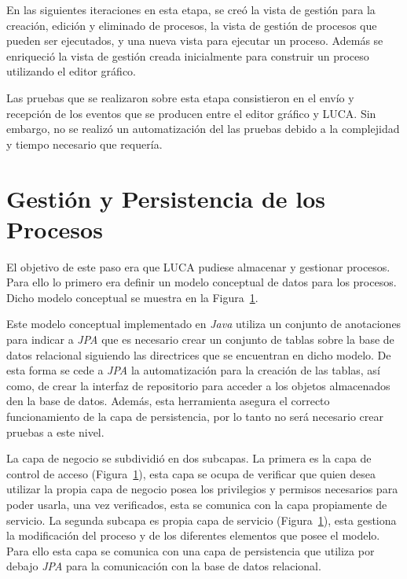 En las siguientes iteraciones en esta etapa, se creó la vista de gestión para la creación, edición y eliminado de procesos, la vista de gestión de procesos que pueden ser ejecutados, y una nueva vista para ejecutar un proceso. Además se enriqueció la vista de gestión creada inicialmente para construir un proceso utilizando el editor gráfico.

Las pruebas que se realizaron sobre esta etapa consistieron en el envío y recepción de los eventos que se producen entre el editor gráfico y LUCA. Sin embargo, no se realizó un automatización del las pruebas debido a la complejidad y tiempo necesario que requería.

\section{Gestión y Persistencia de los Procesos}

El objetivo de este paso era que LUCA pudiese almacenar y gestionar procesos. Para ello lo primero era definir un modelo conceptual de datos para los procesos. Dicho modelo conceptual se muestra en la Figura~\ref{}.

Este modelo conceptual implementado en \emph{Java} utiliza un conjunto de anotaciones para indicar a \emph{JPA}\cite{jpa} que es necesario crear un conjunto de tablas sobre la base de datos relacional siguiendo las directrices que se encuentran en dicho modelo. De esta forma se cede a \emph{JPA} la automatización para la creación de las tablas, así como, de crear la interfaz de repositorio para acceder a los objetos almacenados den la base de datos. Además, esta herramienta asegura el correcto funcionamiento de la capa de persistencia, por lo tanto no será necesario crear pruebas a este nivel.

La capa de negocio se subdividió en dos subcapas. La primera es la capa de control de acceso (Figura~\ref{}), esta capa se ocupa de verificar que quien desea utilizar la propia capa de negocio posea los privilegios y permisos necesarios para poder usarla, una vez verificados, esta se comunica con la capa propiamente de servicio. La segunda subcapa es propia capa de servicio (Figura~\ref{}), esta gestiona la modificación del proceso y de los diferentes elementos que posee el modelo. Para ello esta capa se comunica con una capa de persistencia que utiliza por debajo \emph{JPA} para la comunicación con la base de datos relacional.

